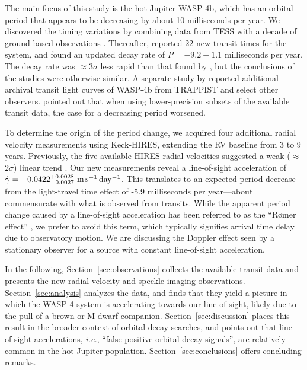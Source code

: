 \documentclass[12pt,twocolumn,tighten]{aastex62}
\begin{document}
The main focus of this study is the hot Jupiter WASP-4b, which has an
orbital period that appears to be decreasing by about 10 milliseconds
per year.  We discovered the timing variations by combining data from
TESS \citep{ricker_transiting_2015} with a decade of ground-based
observations \citep[][hereafter
]{bouma_wasp4b_2019}.  Thereafter,
\citet{southworth_transit_2019} reported 22 new transit times for the
system, and found an updated decay rate of $\dot{P} = -9.2 \pm 1.1$
milliseconds per year. The \citeauthor{southworth_transit_2019} decay
rate was $\approx$3$\sigma$ less rapid than that found by
, but the conclusions of the studies
were otherwise similar.  A separate study by \citet{baluev_2019}
reported additional archival transit light curves of WASP-4b from
TRAPPIST and select other observers.  \citet{baluev_2019} pointed out
that when using lower-precision subsets of the available transit data,
the case for a decreasing period worsened.

To determine the origin of the period change, we acquired four
additional radial velocity measurements using Keck-HIRES, extending
the RV baseline from 3 to 9 years.  Previously, the five available
HIRES radial velocities suggested a weak ($\approx$$2\sigma$) linear
trend \citep{knutson_friends_2014}.  Our new measurements reveal a
line-of-sight acceleration of $\dot{\gamma} =
-0.0422^{+0.0028}_{-0.0027}\ {\rm m\,s^{-1}\,day^{-1}}$.  This
translates to an expected period decrease from the light-travel time
effect of -5.9 milliseconds per year---about commensurate with what is
observed from transits.  While the apparent period change caused by a
line-of-sight acceleration has been referred to as the ``R{\o}mer
effect'' \citep{yee_orbit_2020}, we prefer to avoid this term, which
typically signifies arrival time delay due to observatory motion. We
are discussing the Doppler effect seen by a stationary observer for a
source with constant line-of-sight acceleration.

In the following, Section~\ref{sec:observations} collects the
available transit data and presents the new radial velocity and
speckle imaging observations.  Section~\ref{sec:analysis} analyzes the
data, and finds that they yield a picture in which the WASP-4 system
is accelerating towards our line-of-sight, likely due to the pull of a
brown or M-dwarf companion.  Section~\ref{sec:discussion} places this
result in the broader context of orbital decay searches, and points
out that line-of-sight accelerations, {\it i.e.}, ``false positive
orbital decay signals'', are relatively common in the hot Jupiter
population.  Section~\ref{sec:conclusions} offers concluding remarks.
\end{document}

